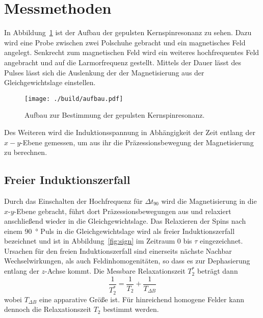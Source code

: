 \section{Messmethoden}%
\label{sec:messmethoden}
In Abbildung~\ref{fig:aufbau} ist der Aufbau der gepulsten Kernspinresonanz zu
sehen. 
Dazu wird eine Probe zwischen zwei Polschuhe gebracht und ein magnetisches Feld
angelegt.
Senkrecht zum magnetischen Feld wird ein weiteres hochfrequentes Feld angebracht
und auf die Larmorfrequenz gestellt. 
Mittels der Dauer lässt des Pulses lässt sich die Auslenkung der
der Magnetisierung aus der Gleichgewichtslage einstellen. 
\begin{figure}[h]
		\centering
		\texttt{[image: ./build/aufbau.pdf]}
		\caption{Aufbau zur Bestimmung der gepulsten Kernspinresonanz.
		\cite{anleitung}}%
		\label{fig:aufbau}
\end{figure}
Des Weiteren wird die Induktionsspannung in Abhängigkeit der Zeit entlang der $x-y$-Ebene gemessen,
um aus ihr die Präzessionsbewegung der Magnetisierung zu berechnen.

\subsection{Freier Induktionszerfall}%
\label{sub:freie_induktionszerfall}
Durch das Einschalten der Hochfrequenz für $\Delta t_{90}$ wird die
Magnetisierung in die $x$-$y$-Ebene gebracht, führt dort Präzessionsbewegungen aus und 
relaxiert anschließend wieder in die Gleichgewichtslage. 
Das Relaxieren der Spins nach einem \SI{90}{\degree} Puls in die
Gleichgewichtslage wird als freier Induktionszerfall bezeichnet und ist in
Abbildung~\ref{fig:sign} im Zeitraum 0 bis $\tau$ eingezeichnet.
Ursachen für den freien Induktionszerfall sind einerseits nächste Nachbar
Wechselwirkungen, als auch Feldinhomogenitäten, so dass es zur Dephasierung
entlang der $z$-Achse kommt.
Die Messbare Relaxationszeit $T_2^*$ beträgt dann
\begin{equation}
		\frac{1}{T_2^*} = \frac{1}{T_2} + \frac{1}{T_{\Delta B}}
\end{equation}
wobei $T_{\Delta B}$ eine apparative Größe ist. 
Für hinreichend homogene Felder kann dennoch die Relaxationszeit $T_2$ 
bestimmt werden. 
